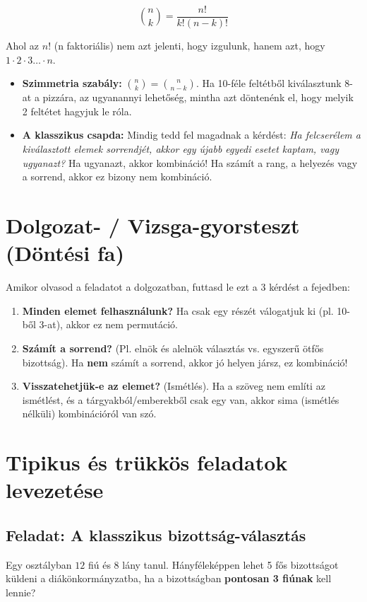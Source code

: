 \documentclass[a4paper,12pt]{article}
\theoremstyle{definition} %
\begin{document}
$$\binom{n}{k} = \frac{n!}{k!(n-k)!}$$

Ahol az $n!$ (n faktoriális) nem azt jelenti, hogy izgulunk, hanem azt, hogy $1 \cdot 2 \cdot 3 \dots \cdot n$.

\begin{tcolorbox}[title=Hasznos tulajdonságok és csapdák]
\begin{itemize}
\item \textbf{Szimmetria szabály:} $\binom{n}{k} = \binom{n}{n-k}$. Ha 10-féle feltétből kiválasztunk 8-at a pizzára, az ugyanannyi lehetőség, mintha azt döntenénk el, hogy melyik 2 feltétet hagyjuk le róla.
    \item \textbf{A klasszikus csapda:} Mindig tedd fel magadnak a kérdést: \textit{Ha felcserélem a kiválasztott elemek sorrendjét, akkor egy újabb egyedi esetet kaptam, vagy ugyanazt?} Ha ugyanazt, akkor kombináció! Ha számít a rang, a helyezés vagy a sorrend, akkor ez bizony nem kombináció.
\end{itemize}
\end{tcolorbox}

\section{Dolgozat- / Vizsga-gyorsteszt (Döntési fa)}
Amikor olvasod a feladatot a dolgozatban, futtasd le ezt a 3 kérdést a fejedben:
\begin{enumerate}
    \item \textbf{Minden elemet felhasználunk?} Ha csak egy részét válogatjuk ki (pl. 10-ből 3-at), akkor ez nem permutáció.
    \item \textbf{Számít a sorrend?} (Pl. elnök és alelnök választás vs. egyszerű ötfős bizottság). Ha \textbf{nem} számít a sorrend, akkor jó helyen jársz, ez kombináció!
    \item \textbf{Visszatehetjük-e az elemet?} (Ismétlés). Ha a szöveg nem említi az ismétlést, és a tárgyakból/emberekből csak egy van, akkor sima (ismétlés nélküli) kombinációról van szó.
\end{enumerate}

\section{Tipikus és trükkös feladatok levezetése}

\subsection*{Feladat: A klasszikus bizottság-választás}
\begin{tcolorbox}
Egy osztályban $12$ fiú és $8$ lány tanul. Hányféleképpen lehet 5 fős bizottságot küldeni a diákönkormányzatba, ha a bizottságban \textbf{pontosan 3 fiúnak} kell lennie?
\end{tcolorbox}
\end{document}
